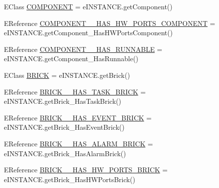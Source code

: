 \begin{DoxyCompactItemize}
\item 
E\-Class \hyperlink{interfaceshootingmachineemfmodel_1_1_shootingmachineemfmodel_package_1_1_literals_af05b7cb28e9a2e08bd406d349281ba61}{C\-O\-M\-P\-O\-N\-E\-N\-T} = e\-I\-N\-S\-T\-A\-N\-C\-E.\-get\-Component()
\item 
E\-Reference \hyperlink{interfaceshootingmachineemfmodel_1_1_shootingmachineemfmodel_package_1_1_literals_af00875b2bf09abb0623ee37ecc1eadcb}{C\-O\-M\-P\-O\-N\-E\-N\-T\-\_\-\-\_\-\-H\-A\-S\-\_\-\-H\-W\-\_\-\-P\-O\-R\-T\-S\-\_\-\-C\-O\-M\-P\-O\-N\-E\-N\-T} = e\-I\-N\-S\-T\-A\-N\-C\-E.\-get\-Component\-\_\-\-Has\-H\-W\-Ports\-Component()
\item 
E\-Reference \hyperlink{interfaceshootingmachineemfmodel_1_1_shootingmachineemfmodel_package_1_1_literals_a20a06c9e56e70db80e097c0b1aa0a123}{C\-O\-M\-P\-O\-N\-E\-N\-T\-\_\-\-\_\-\-H\-A\-S\-\_\-\-R\-U\-N\-N\-A\-B\-L\-E} = e\-I\-N\-S\-T\-A\-N\-C\-E.\-get\-Component\-\_\-\-Has\-Runnable()
\item 
E\-Class \hyperlink{interfaceshootingmachineemfmodel_1_1_shootingmachineemfmodel_package_1_1_literals_aeda309dbd4de2ccf2cad42f23991a952}{B\-R\-I\-C\-K} = e\-I\-N\-S\-T\-A\-N\-C\-E.\-get\-Brick()
\item 
E\-Reference \hyperlink{interfaceshootingmachineemfmodel_1_1_shootingmachineemfmodel_package_1_1_literals_ace663d9af7558e3ffaf107fc2bfd2a1d}{B\-R\-I\-C\-K\-\_\-\-\_\-\-H\-A\-S\-\_\-\-T\-A\-S\-K\-\_\-\-B\-R\-I\-C\-K} = e\-I\-N\-S\-T\-A\-N\-C\-E.\-get\-Brick\-\_\-\-Has\-Task\-Brick()
\item 
E\-Reference \hyperlink{interfaceshootingmachineemfmodel_1_1_shootingmachineemfmodel_package_1_1_literals_a34373f53d36caa5f691d30fbca28baf6}{B\-R\-I\-C\-K\-\_\-\-\_\-\-H\-A\-S\-\_\-\-E\-V\-E\-N\-T\-\_\-\-B\-R\-I\-C\-K} = e\-I\-N\-S\-T\-A\-N\-C\-E.\-get\-Brick\-\_\-\-Has\-Event\-Brick()
\item 
E\-Reference \hyperlink{interfaceshootingmachineemfmodel_1_1_shootingmachineemfmodel_package_1_1_literals_afbd4cc7a09e1ba73ef82ce8898cb2eb7}{B\-R\-I\-C\-K\-\_\-\-\_\-\-H\-A\-S\-\_\-\-A\-L\-A\-R\-M\-\_\-\-B\-R\-I\-C\-K} = e\-I\-N\-S\-T\-A\-N\-C\-E.\-get\-Brick\-\_\-\-Has\-Alarm\-Brick()
\item 
E\-Reference \hyperlink{interfaceshootingmachineemfmodel_1_1_shootingmachineemfmodel_package_1_1_literals_a30e0a585f71efea6eee6c72f3f9b02c7}{B\-R\-I\-C\-K\-\_\-\-\_\-\-H\-A\-S\-\_\-\-H\-W\-\_\-\-P\-O\-R\-T\-S\-\_\-\-B\-R\-I\-C\-K} = e\-I\-N\-S\-T\-A\-N\-C\-E.\-get\-Brick\-\_\-\-Has\-H\-W\-Ports\-Brick()
\item 

\end{DoxyCompactItemize}
